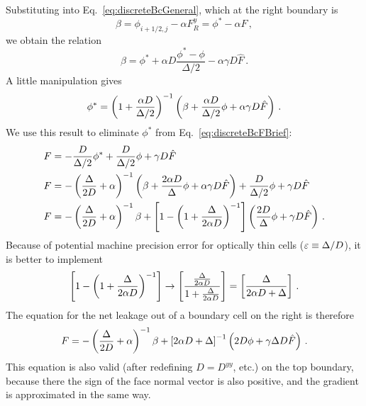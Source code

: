 Substituting into Eq.~\eqref{eq:discreteBcGeneral}, which at the right boundary
is
\begin{equation*}
  \beta
  = \phi_{i+1/2,j}
  - \alpha F_R^y
  = \phi^* - \alpha F \,,
\end{equation*}
we obtain the relation
\begin{equation*}
  \beta
  = \phi^*
  + \alpha D \frac{\phi^* - \phi}{\Delta / 2}
  - \alpha \gamma D \hat F \,.
\end{equation*}
A little manipulation gives
\begin{equation*}
  \phi^* = \left( 1 + \frac{\alpha D}{\Delta/2} \right)^{-1} \left( \beta
  + \frac{\alpha D}{\Delta/2} \phi + \alpha \gamma D \hat F
  \right)\,.
\end{equation*}
We use this result to eliminate $\phi^*$ from Eq.~\eqref{eq:discreteBcFBrief}:
\begin{align*}
  F
  &= - \frac{D}{\Delta / 2} \phi^* + \frac{D}{\Delta / 2}\phi
  + \gamma D \hat F
  \\
  F
  &= -\left(  \frac{\Delta}{2 D} + \alpha\right)^{-1}
  \left( \beta
  + \frac{2 \alpha D}{\Delta} \phi + \alpha \gamma D \hat F
  \right)
  + \frac{D}{\Delta / 2}\phi
  + \gamma D \hat F
  \\
  F
  &= -\left(  \frac{\Delta}{2 D} + \alpha\right)^{-1} \beta
  + \left[ 1 - \left(1 + \frac{\Delta}{2 \alpha D} \right)^{-1} \right]
  \left( \frac{2D}{\Delta} \phi + \gamma D \hat F \right) \,.
\end{align*}
Because of potential machine precision error for optically thin cells
($\varepsilon \equiv \Delta / D$), it is better to implement
\begin{equation*}
  \left[ 1 - \left( 1 + \frac{\Delta}{2 \alpha D} \right)^{-1}  \right]
  \to \left[ \frac{\frac{\Delta}{2 \alpha D}}{1 + \frac{\Delta}{2 \alpha D}}
  \right]
  = \left[ \frac{\Delta}{2 \alpha D + \Delta} \right]\,.
\end{equation*}
The equation for the net leakage out of a boundary cell on the right is
therefore
\begin{equation} \label{eq:discreteBcRight}
  F
  = -\left(  \frac{\Delta}{2 D} + \alpha\right)^{-1} \beta
  + \left[ 2 \alpha D + \Delta \right]^{-1}
  \left( 2D \phi + \gamma \Delta D \hat F \right) \,.
\end{equation}
This equation is also valid (after redefining $D=D^{yy}$, etc.) on the top
boundary, because there the sign of the face normal vector is also positive, and
the gradient is approximated in the same way.

